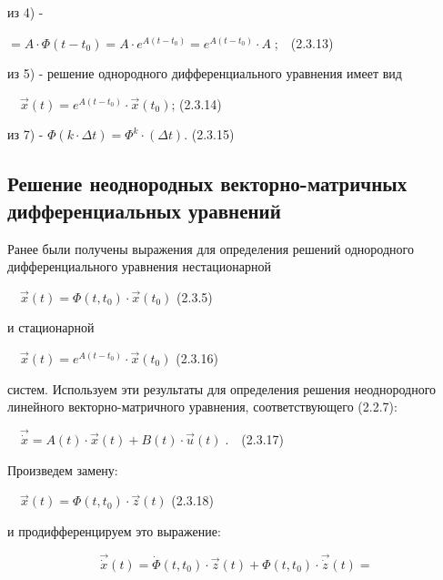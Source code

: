 		из 4) - 



		$=A\cdot \Phi (t-t_0)=A\cdot e^{A(t-t_0)}=e^{A(t-t_0)}\cdot A\;$;\ \ (2.3.13)



		из 5) - решение однородного дифференциального уравнения имеет вид



		\ \  $\vec x(t)=e^{A(t-t_0)}\cdot \vec x(t_0)$;  (2.3.14)



		из 7) -  $\Phi (k\cdot \mathit{\Delta t})=\Phi ^k\cdot (\mathit{\Delta t})$.  (2.3.15)



\bigskip


\bigskip

\subsection{Решение неоднородных векторно-матричных дифференциальных уравнений}

		Ранее были получены выражения для определения решений однородного дифференциального уравнения нестационарной



		\ \  $\vec x(t)=\Phi (t,t_0)\cdot \vec x(t_0)$  (2.3.5)



		и стационарной 



		\ \  $\vec x(t)=e^{A(t-t_0)}\cdot \vec x(t_0)$  (2.3.16)



		систем. Используем эти результаты для определения решения неоднородного линейного векторно-матричного уравнения,
		соответствующего (2.2.7):



		\ \  $\vec{\dot x}=A(t)\cdot \vec x(t)+B(t)\cdot \vec u(t)\;$.\ \ (2.3.17)



		Произведем замену:



		\ \  $\vec x(t)=\Phi (t,t_0)\cdot \vec z(t)$  (2.3.18)



		и продифференцируем это выражение:


\begin{equation*}
\vec{\dot x}(t)=\dot \Phi (t,t_0)\cdot \vec z(t)+\Phi (t,t_0)\cdot \vec{\dot z}(t)=
\end{equation*}

